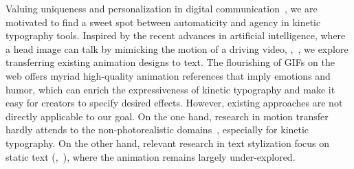 Valuing uniqueness and personalization in digital communication~\cite{viegas09participatory, laura2013anytype}, we are motivated to find a sweet spot between automaticity and agency in kinetic typography tools.
Inspired by the recent advances in artificial intelligence, where a head image can talk by mimicking the motion of a driving video, \eg,~\cite{zhou2020makeittalk, hong2022depth}, we explore transferring existing animation designs to text.
The flourishing of GIFs on the web offers myriad high-quality animation references that imply emotions and humor, which can enrich the expressiveness of kinetic typography and make it easy for creators to specify desired effects.
However, existing approaches are not directly applicable to our goal.
On the one hand, research in motion transfer hardly attends to the non-photorealistic domains~\cite{siarohin2019first,xu2022motion}, especially for kinetic typography.
On the other hand, relevant research in text stylization focus on static text (\eg,~\cite{iluz2023word,xu2007calligraphic}), where the animation remains largely under-explored.



